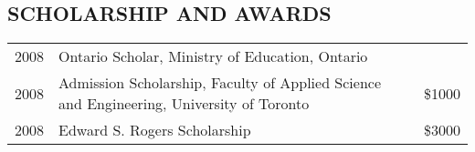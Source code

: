 \documentclass{res}
\begin{document}
\begin{resume}
\section{SCHOLARSHIP AND AWARDS}          
    \begin{tabular} {l l r}
      2008 & Ontario Scholar, Ministry of Education, Ontario & \\
      2008 & Admission Scholarship, Faculty of Applied Science and Engineering, University of Toronto & \$1000 \\
      2008 & Edward S. Rogers Scholarship & \$3000 \\
    \end{tabular}

\end{resume}
\end{document}
